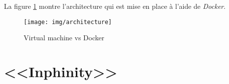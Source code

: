 La figure \ref{fig:architecture} montre l'architecture qui est mise en place à l'aide de \emph{Docker}.

\begin{figure}[H] 
\centering 
\texttt{[image: img/architecture]} 
\caption[architecture]{Virtual machine vs Docker}
\label{fig:architecture} 
\end{figure}



\section{<<Inphinity>>}

















